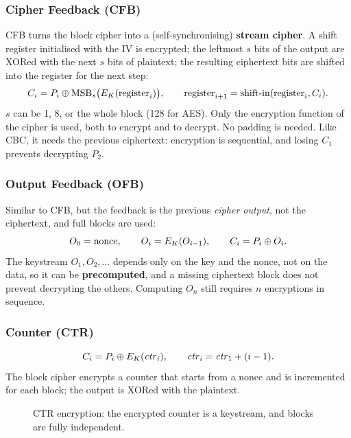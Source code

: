 \subsubsection{Cipher Feedback (CFB)}

CFB turns the block cipher into a (self-synchronising) \textbf{stream cipher}. A shift register initialised with the IV is encrypted; the leftmost $s$ bits of the output are XORed with the next $s$ bits of plaintext; the resulting ciphertext bits are shifted into the register for the next step:
\[
    C_i = P_i \oplus \mathrm{MSB}_s\bigl(E_K(\text{register}_i)\bigr), \qquad \text{register}_{i+1} = \text{shift-in}(\text{register}_i, C_i).
\]
$s$ can be 1, 8, or the whole block (128 for AES). Only the encryption function of the cipher is used, both to encrypt and to decrypt. No padding is needed. Like CBC, it needs the previous ciphertext: encryption is sequential, and losing $C_1$ prevents decrypting $P_2$.

\subsubsection{Output Feedback (OFB)}

Similar to CFB, but the feedback is the previous \emph{cipher output}, not the ciphertext, and full blocks are used:
\[
    O_0 = \text{nonce}, \qquad O_i = E_K(O_{i-1}), \qquad C_i = P_i \oplus O_i.
\]
The keystream $O_1, O_2, \dots$ depends only on the key and the nonce, not on the data, so it can be \textbf{precomputed}, and a missing ciphertext block does not prevent decrypting the others. Computing $O_n$ still requires $n$ encryptions in sequence.

\subsubsection{Counter (CTR)}

\[
    C_i = P_i \oplus E_K(\mathit{ctr}_i), \qquad \mathit{ctr}_i = \mathit{ctr}_1 + (i-1).
\]
The block cipher encrypts a counter that starts from a nonce and is incremented for each block; the output is XORed with the plaintext.

\begin{figure}[H]
\centering
{}
\caption{CTR encryption: the encrypted counter is a keystream, and blocks are fully independent.}
\label{fig:ctr}
\end{figure}

